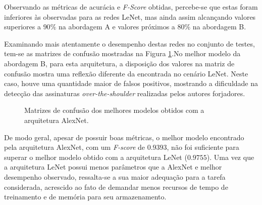 Observando as métricas de acurácia e \emph{F-Score} obtidas, percebe-se que estas foram inferiores às observadas para as redes LeNet, mas ainda assim alcançando valores superiores a $90\%$ na abordagem A e valores próximos a $80\%$ na abordagem B.

Examinando mais atentamente o desempenho destas redes no conjunto de testes, tem-se as matrizes de confusão mostradas na Figura \ref{fig:matrizes-alexnet}.No melhor modelo da abordagem B, para esta arquitetura, a disposição dos valores na matriz de confusão mostra uma reflexão diferente da encontrada no cenário LeNet. Neste caso, houve uma quantidade maior de falsos positivos, mostrando a dificuldade na detecção das assinaturas \emph{over-the-shoulder} realizadas pelos autores forjadores.

\begin{figure}[H]
 \centering
 \caption{Matrizes de confusão dos melhores modelos obtidos com a arquitetura AlexNet.}
 \hfill
 \label{fig:matrizes-alexnet}
\end{figure}

De modo geral, apesar de possuir boas métricas, o melhor modelo encontrado pela arquitetura AlexNet, com um \emph{F-score} de $0.9393$, não foi suficiente para superar o melhor modelo obtido com a arquitetura LeNet ($0.9755$). Uma vez que a arquitetura LeNet possui menos parâmetros que a AlexNet e melhor desempenho observado, ressalta-se a sua maior adequação para a tarefa considerada, acrescido ao fato de demandar menos recursos de tempo de treinamento e de memória para seu armazenamento.
